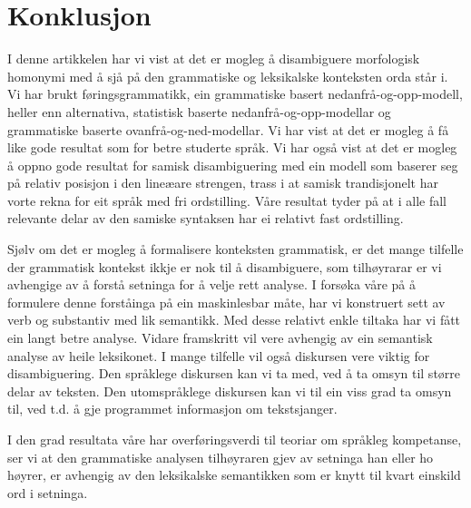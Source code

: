 \documentclass[a4paper,norsk]{article}
\begin{document}
\section{Konklusjon}

I denne artikkelen har vi vist at det er mogleg å disambiguere morfologisk homonymi med å sjå på den grammatiske og leksikalske konteksten orda står i. Vi har brukt føringsgrammatikk, ein grammatiske basert nedanfrå-og-opp-modell, heller enn alternativa, statistisk baserte nedanfrå-og-opp-modellar og grammatiske baserte ovanfrå-og-ned-modellar. Vi har vist at det er mogleg å få like gode resultat som for betre studerte språk. Vi har også vist at det er mogleg å oppno gode resultat for samisk disambiguering med ein modell som baserer seg på relativ posisjon i den lineæare strengen, trass i at samisk trandisjonelt har vorte rekna for eit språk med fri ordstilling. Våre resultat tyder på at i alle fall relevante delar av den samiske syntaksen har ei relativt fast ordstilling.  %

Sjølv om det er mogleg å formalisere konteksten grammatisk, er det mange tilfelle der grammatisk kontekst ikkje er nok til å disambiguere, som tilhøyrarar er vi avhengige av å forstå setninga for å velje rett analyse. I forsøka våre på å formulere denne forståinga på ein maskinlesbar måte, har vi konstruert sett av verb og substantiv med lik semantikk. Med desse relativt enkle tiltaka har vi fått ein langt betre analyse. Vidare framskritt vil vere avhengig av ein semantisk analyse av heile leksikonet. I mange tilfelle vil også diskursen vere viktig for disambiguering. Den språklege diskursen kan vi ta med, ved å ta omsyn til større delar av teksten. Den utomspråklege diskursen kan vi til ein viss grad ta omsyn til, ved t.d. å gje programmet informasjon om tekstsjanger. %

I den grad resultata våre har overføringsverdi til teoriar om språkleg kompetanse, ser vi at den grammatiske analysen tilhøyraren gjev av setninga han eller ho høyrer, er avhengig av den leksikalske semantikken som er knytt til kvart einskild ord i setninga. %





\end{document}
